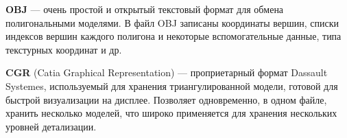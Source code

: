 
\textbf{OBJ} --- очень простой и открытый текстовый формат для обмена полигональными моделями. В файл OBJ записаны координаты вершин, списки индексов вершин каждого полигона и некоторые вспомогательные данные, типа текстурных координат и др.



\textbf{CGR} (Catia Graphical Representation) --- проприетарный формат Dassault Systemes, используемый для хранения триангулированной модели, готовой для быстрой визуализации на дисплее. Позволяет одновременно, в одном файле, хранить несколько моделей, что широко применяется для хранения нескольких уровней детализации.






